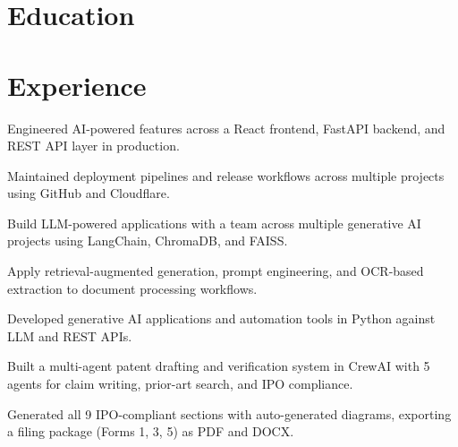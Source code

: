\documentclass[a4paper,10pt]{article}
\begin{document}

\section{Education}
\eduschool

\section{Experience}

\begin{points}
  \item Engineered AI-powered features across a React frontend, FastAPI backend, and REST API layer in production.
  \item Maintained deployment pipelines and release workflows across multiple projects using GitHub and Cloudflare.
\end{points}
\gap

\begin{points}
  \item Build LLM-powered applications with a team across multiple generative AI projects using LangChain, ChromaDB, and FAISS.
  \item Apply retrieval-augmented generation, prompt engineering, and OCR-based extraction to document processing workflows.
\end{points}
\gap

\begin{points}
  \item Developed generative AI applications and automation tools in Python against LLM and REST APIs.
\end{points}
\gap

\begin{points}
  \item Built a multi-agent patent drafting and verification system in CrewAI with 5 agents for claim writing, prior-art search, and IPO compliance.
  \item Generated all 9 IPO-compliant sections with auto-generated diagrams, exporting a filing package (Forms 1, 3, 5) as PDF and DOCX.
\end{points}
\gap
\end{document}
